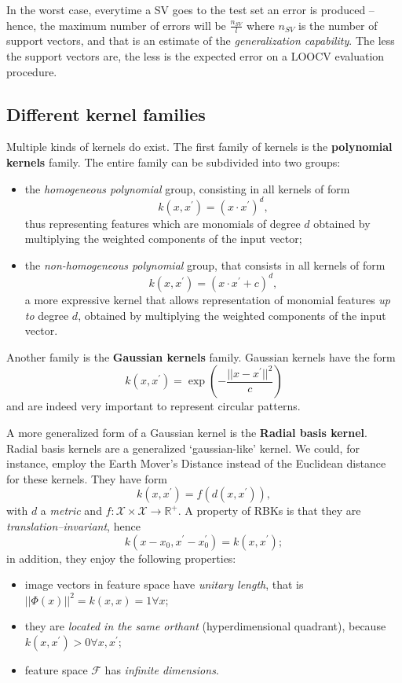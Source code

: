 \documentclass[10pt]{report}
\begin{document}
In the worst case, everytime a SV goes to the test set an error is produced --
hence, the maximum number of errors will be \(\displaystyle \frac{n_{SV}}{l}\)
where \(n_{SV}\) is the number of support vectors, and that is an estimate of the
\emph{generalization capability}. The less the support vectors are, the less is the
expected error on a LOOCV evaluation procedure.

\subsection{Different kernel families}
\label{sec:org92348ce}

Multiple kinds of kernels do exist. The first family of kernels is the
\textbf{polynomial kernels} family. The entire family can be subdivided into two
groups:
\begin{itemize}
\item the \emph{homogeneous polynomial} group, consisting in all kernels of form
$$k(x, x^\prime) = \left(x\cdot x^\prime\right)^d,$$ thus representing
features which are monomials of degree \(d\) obtained by multiplying the
weighted components of the input vector;
\item the \emph{non\--homogeneous polynomial} group, that consists in all kernels of form
$$k(x, x^\prime) = \left(x\cdot x^\prime + c\right)^d,$$ a more expressive
kernel that allows representation of monomial features \emph{up to} degree \(d\),
obtained by multiplying the weighted components of the input vector.
\end{itemize}

Another family is the \textbf{Gaussian kernels} family. Gaussian kernels have the form
$$k(x, x^\prime) = \exp{\left(-\frac{||x - x^\prime||^2}{c}\right)}$$ and are
indeed very important to represent circular patterns.

A more generalized form of a Gaussian kernel is the \textbf{Radial basis kernel}.
Radial basis kernels are a generalized `gaussian-like' kernel. We could, for
instance, employ the Earth Mover's Distance instead of the Euclidean distance
for these kernels. They have form $$k(x, x^\prime) = f(d(x,x^\prime)),$$ with
\(d\) a \emph{metric} and \(f:\mathcal X \times \mathcal X \rightarrow \mathbb{R}^+\). A
property of RBKs is that they are \emph{translation\---invariant}, hence $$k(x-x_0,
x^\prime-x_0^\prime) = k(x,x^\prime);$$ in addition, they enjoy the following
properties:
\begin{itemize}
\item image vectors in feature space have \emph{unitary length}, that is
\(||\Phi(x)||^2 = k(x,x) = 1 \forall x\);
\item they are \emph{located in the same orthant} (hyperdimensional quadrant), because \(k(x,x^\prime) > 0 \forall x,x^\prime\);
\item feature space \(\mathcal F\) has \emph{infinite dimensions}.
\end{itemize}
\end{document}

